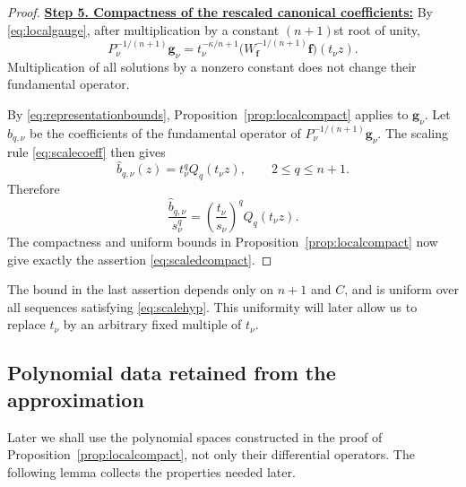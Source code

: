 \documentclass[12pt,letterpaper,reqno]{amsart}
\theoremstyle{definition}
\numberwithin{equation}{section}
\newcommand{\fv}{\bm f}
\newcommand{\gv}{\bm g}
\begin{document}
\begin{proof}
\medskip\noindent
\textbf{\underline{Step 5. Compactness of the rescaled canonical coefficients:}}
By \eqref{eq:localgauge}, after multiplication by a constant
\((n+1)\)st root of unity,
\[
 P_\nu^{-1/(n+1)}\gv_\nu
 =
 t_\nu^{-\kappa/{n+1}}
 \bigl(W_{\fv}^{-1/(n+1)}\fv\bigr)(t_\nu z).
\]
Multiplication of all solutions by a nonzero constant does not change
their fundamental operator.

By \eqref{eq:representationbounds},
Proposition~\ref{prop:localcompact} applies to \(\gv_\nu\). Let
\(\widehat b_{q,\nu}\) be the coefficients of the fundamental operator
of \(P_\nu^{-1/(n+1)}\gv_\nu\). The scaling rule
\eqref{eq:scalecoeff} then gives
\begin{equation}\label{eq:canonical-coefficient-identification}
 \widehat b_{q,\nu}(z)
 =
 t_\nu^qQ_q(t_\nu z),
 \qquad
 2\leq q\leq n+1.
\end{equation}
Therefore
\[
 \frac{\widehat b_{q,\nu}}{s_\nu^q}
 =
 \left(\frac{t_\nu}{s_\nu}\right)^qQ_q(t_\nu z).
\]
The compactness and uniform bounds in
Proposition~\ref{prop:localcompact} now give exactly the assertion
\eqref{eq:scaledcompact}.
\end{proof}

The bound in the last assertion depends only on \({n+1}\) and \(C\), and
is uniform over all sequences satisfying \eqref{eq:scalehyp}. This
uniformity will later allow us to replace \(t_\nu\) by an arbitrary
fixed multiple of \(t_\nu\).


\subsection{Polynomial data retained from the approximation}
\label{sec:replacement}

Later we shall use the polynomial spaces constructed in the proof of
Proposition~\ref{prop:localcompact}, not only their differential
operators. The following lemma collects the properties needed later.
\end{document}
